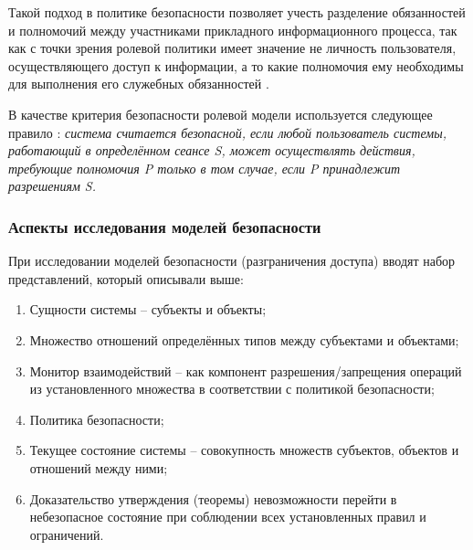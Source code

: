 Такой подход в политике безопасности позволяет учесть разделение обязанностей и полномочий между 
участниками прикладного информационного процесса, так как с точки зрения ролевой политики имеет 
значение не личность пользователя, осуществляющего доступ к информации, а то какие полномочия ему 
необходимы для выполнения его служебных обязанностей \autocite{Zegzhda}. 

В качестве критерия безопасности ролевой модели используется следующее правило \autocite{Zegzhda}: 
\textit{система считается безопасной, если любой пользователь системы, работающий в определённом 
сеансе S, может осуществлять действия, требующие полномочия P только в том случае, если P принадлежит 
разрешениям S.}

\subsubsection{Аспекты исследования моделей безопасности}

При исследовании моделей безопасности (разграничения доступа) вводят набор представлений, 
который описывали выше: 
\begin{enumerate}
    \item Сущности системы -- субъекты и объекты;

    \item Множество отношений определённых типов между субъектами и объектами;

    \item Монитор взаимодействий -- как компонент разрешения/запрещения операций из установленного 
    множества в соответствии с политикой безопасности;

    \item Политика безопасности;

    \item Текущее состояние системы -- совокупность множеств субъектов, объектов и отношений между ними;

    \item Доказательство утверждения (теоремы) невозможности перейти в небезопасное состояние при 
    соблюдении всех установленных правил и ограничений.
\end{enumerate}


